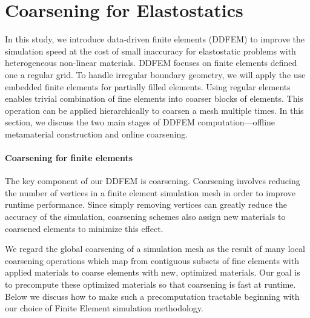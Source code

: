 \section{Coarsening for Elastostatics}
In this study, we introduce data-driven finite elements (DDFEM) to 
improve the simulation speed at the cost of small inaccuracy for elastostatic problems with heterogeneous non-linear materials. DDFEM focuses on finite elements defined one a regular grid.
To handle irregular boundary geometry, we will apply the use embedded finite elements for partially filled elements.
Using regular elements enables trivial combination of fine elements into coarser blocks of elements. This operation can be applied hierarchically to coarsen a mesh multiple times.
In this section, we discuss the two main stages of DDFEM computation---offline metamaterial construction and online coarsening.

\paragraph{Coarsening for finite elements}
The key component of our DDFEM is coarsening. Coarsening involves reducing the number of vertices in a finite element simulation mesh in order to improve runtime performance. Since simply removing vertices can greatly reduce the accuracy of the simulation, coarsening schemes also assign new materials to coarsened elements to minimize this effect.

We regard the global coarsening of a simulation mesh as the result of many local coarsening operations which map from contiguous subsets of fine elements with applied materials to coarse elements with new, optimized materials.
Our goal is to precompute these optimized materials so that coarsening is fast at runtime.
Below we discuss how to make such a precomputation tractable beginning with our choice of Finite Element simulation methodology.

